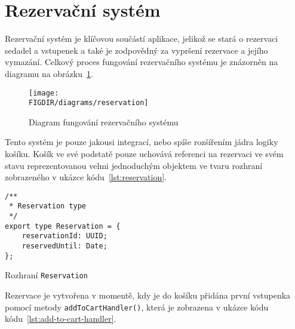 \section{Rezervační systém}
\label{sec:implementace-rezervace}
Rezervační systém je klíčovou součástí aplikace, jelikož se stará o rezervaci sedadel a vstupenek a také je zodpovědný za vypršení rezervace a jejího vymazání.
Celkový proces fungování rezervačního systému je znázorněn na diagramu na obrázku~\ref{fig:reservation-system-diagram}.

\begin{figure}[H]
    \centering
    \texttt{[image: \\FIGDIR/diagrams/reservation]}
    \caption{Diagram fungování rezervačního systému}
    \label{fig:reservation-system-diagram}
\end{figure}

Tento systém je pouze jakousi integrací, nebo spíše rozšířením jádra logiky košíku.
Košík ve své podstatě pouze uchovává referenci na rezervaci ve svém stavu reprezentovanou velmi jednoduchým objektem ve tvaru rozhraní zobrazeného v ukázce kódu~\ref{lst:reservation}.

\begin{listing}[H]
    \begin{verbatim}
/**
 * Reservation type
 */
export type Reservation = {
	reservationId: UUID;
	reservedUntil: Date;
};
    \end{verbatim}
    \caption{Rozhraní \texttt{Reservation}}
    \label{lst:reservation}
\end{listing}

Rezervace je vytvořena v momentě, kdy je do košíku přidána první vstupenka pomocí metody \texttt{addToCartHandler()}, která je zobrazena v ukázce kódu kódu~\ref{lst:add-to-cart-handler}.


